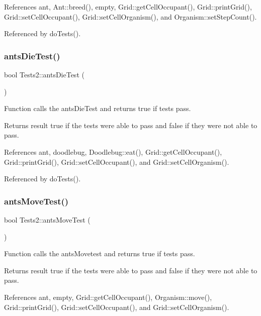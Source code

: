 References ant, Ant\+::breed(), empty, Grid\+::get\+Cell\+Occupant(), Grid\+::print\+Grid(), Grid\+::set\+Cell\+Occupant(), Grid\+::set\+Cell\+Organism(), and Organism\+::set\+Step\+Count().



Referenced by do\+Tests().

\mbox{\label{classTests2_a045d58417814d72bcf4c97b2ebb51461}} 
\subsubsection{ants\+Die\+Test()}
{\footnotesize\ttfamily bool Tests2\+::ants\+Die\+Test (\begin{DoxyParamCaption}{ }\end{DoxyParamCaption})}

Function calls the ants\+Die\+Test and returns true if tests pass.

\begin{DoxyReturn}{Returns}
result true if the tests were able to pass and false if they were not able to pass. 
\end{DoxyReturn}


References ant, doodlebug, Doodlebug\+::eat(), Grid\+::get\+Cell\+Occupant(), Grid\+::print\+Grid(), Grid\+::set\+Cell\+Occupant(), and Grid\+::set\+Cell\+Organism().



Referenced by do\+Tests().

\mbox{\label{classTests2_a7694d2797eba6fadc40234d527f6afbe}} 
\subsubsection{ants\+Move\+Test()}
{\footnotesize\ttfamily bool Tests2\+::ants\+Move\+Test (\begin{DoxyParamCaption}{ }\end{DoxyParamCaption})}

Function calls the ants\+Movetest and returns true if tests pass.

\begin{DoxyReturn}{Returns}
result true if the tests were able to pass and false if they were not able to pass. 
\end{DoxyReturn}


References ant, empty, Grid\+::get\+Cell\+Occupant(), Organism\+::move(), Grid\+::print\+Grid(), Grid\+::set\+Cell\+Occupant(), and Grid\+::set\+Cell\+Organism().



